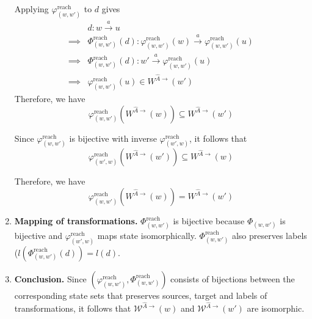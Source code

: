 \begin{proofE}
\begin{enumerate}
    Applying $\varphi_{(w,w')}^{\text{reach}}$ to $d$ gives
    \begin{align}
        & d: w \xrightarrow{a} u \\
        \implies & \Phi_{(w,w')}^{\text{reach}}(d): \varphi_{(w,w')}^{\text{reach}}(w) \xrightarrow{a} \varphi_{(w,w')}^{\text{reach}}(u) \\
        \implies & \Phi_{(w,w')}^{\text{reach}}(d): w' \xrightarrow{a} \varphi_{(w,w')}^{\text{reach}}(u) \\
        \implies & \varphi_{(w,w')}^{\text{reach}}(u) \in W^{\hat{A}\to}(w')
    \end{align}
    Therefore, we have
    \begin{equation}
        \varphi_{(w,w')}^{\text{reach}}(W^{\hat{A}\to}(w)) \subseteq W^{\hat{A}\to}(w')
    \end{equation}

    Since $\varphi_{(w,w')}^{\text{reach}}$ is bijective with inverse $\varphi_{(w',w)}^{\text{reach}}$, it follows that
    \begin{equation}
        \varphi_{(w',w)}^{\text{reach}}(W^{\hat{A}\to}(w')) \subseteq W^{\hat{A}\to}(w)
    \end{equation}

    Therefore, we have
    \begin{equation}
        \varphi_{(w,w')}^{\text{reach}}(W^{\hat{A}\to}(w)) = W^{\hat{A}\to}(w')
    \end{equation}

    \item \textbf{Mapping of transformations.}
    $\Phi_{(w,w')}^{\text{reach}}$ is bijective because $\Phi_{(w,w')}$ is bijective and $\varphi_{(w',w)}^{\text{reach}}$ maps state isomorphically. 
    $\Phi_{(w,w')}^{\text{reach}}$ also preserves labels ($l(\Phi_{(w,w')}^{\text{reach}}(d)) = l(d)$.
    
    \item \textbf{Conclusion.}
    Since $(\varphi_{(w,w')}^{\text{reach}}, \Phi_{(w,w')}^{\text{reach}})$ consists of bijections between the corresponding state sets that preserves sources, target and labels of transformations, it follows that $\mathscr{W}^{\hat{A}\to}(w)$ and $\mathscr{W}^{\hat{A}\to}(w')$ are isomorphic.
\end{enumerate}
\end{proofE}


\paragraph{
}

